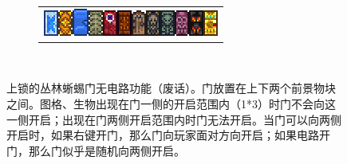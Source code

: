 \begin{figure}[!ht]
\begin{figure}[!ht]
{\begin{tabular}[b]{c}
\quad\includegraphics{figures/Frozen_Door.png}\quad\includegraphics{figures/Honey_Door.png}\quad\includegraphics{figures/Slime_Door.png}\quad\includegraphics{figures/Bone_Door.png}\quad\includegraphics{figures/Flesh_Door.png}\quad\includegraphics{figures/Lihzahrd_Door.png}\quad\includegraphics{figures/Dungeon_Door.png}\quad\includegraphics{figures/Blue_Dungeon_Door.png}\quad\includegraphics{figures/Green_Dungeon_Door.png}\quad\includegraphics{figures/Pink_Dungeon_Door.png}\quad\includegraphics{figures/Obsidian_Door.png}\quad\includegraphics{figures/Golden_Door.png}
\end{tabular}}%
\\
\qquad
{}
\caption{}
\end{figure}
上锁的丛林蜥蜴门无电路功能（废话）。门放置在上下两个前景物块之间。图格、生物出现在门一侧的开启范围内（1*3）时门不会向这一侧开启；出现在门两侧开启范围内时门无法开启。当门可以向两侧开启时，如果右键开门，那么门向玩家面对方向开启；如果电路开门，那么门似乎是随机向两侧开启。


\end{figure}
